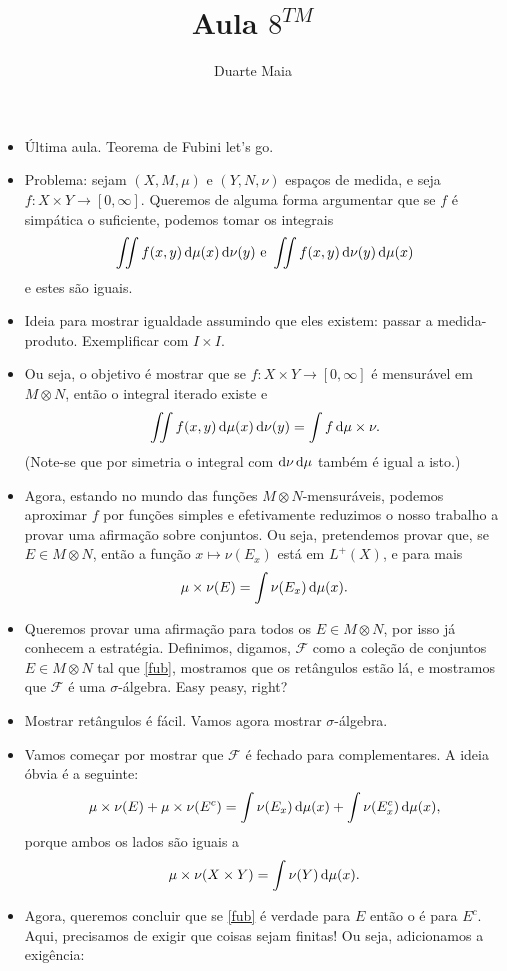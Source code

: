 \documentclass{article}
\title{Aula $8^{TM}$}
\author{Duarte Maia}
\date{}
\renewcommand{\cal}[1]{\mathcal{#1}}
\begin{document}
\maketitle

\begin{itemize}
\item Última aula. Teorema de Fubini let's go.
\item Problema: sejam $(X,M,\mu)$ e $(Y,N,\nu)$ espaços de medida, e seja $f : X \times Y \to [0,\infty]$. Queremos de alguma forma argumentar que se $f$ é simpática o suficiente, podemos tomar os integrais
\[\iint f(x,y) \dif \mu(x) \dif \nu(y) \text{ e } \iint f(x,y) \dif \nu(y) \dif \mu(x)\]
e estes são iguais.
\item Ideia para mostrar igualdade assumindo que eles existem: passar a medida-produto. Exemplificar com $I \times I$.
\item Ou seja, o objetivo é mostrar que se $f : X \times Y \to [0,\infty]$ é mensurável em $M \otimes N$, então o integral iterado existe e
\[\iint f(x,y) \dif \mu(x) \dif \nu(y) = \int f \dif \mu \times \nu.\]
(Note-se que por simetria o integral com $\dif \nu \dif \mu$ também é igual a isto.)
\item Agora, estando no mundo das funções $M \otimes N$-mensuráveis, podemos aproximar $f$ por funções simples e efetivamente reduzimos o nosso trabalho a provar uma afirmação sobre conjuntos. Ou seja, pretendemos provar que, se $E \in M \otimes N$, então a função $x \mapsto \nu(E_x)$ está em $L^+(X)$, e para mais
\begin{equation}\label{fub}
\mu \times \nu(E) = \int \nu(E_x) \dif \mu(x).
\end{equation}
\item Queremos provar uma afirmação para todos os $E \in M \otimes N$, por isso já conhecem a estratégia. Definimos, digamos, $\cal F$ como a coleção de conjuntos $E \in M \otimes N$ tal que \eqref{fub}, mostramos que os retângulos estão lá, e mostramos que $\cal F$ é uma $\sigma$-álgebra. Easy peasy, right?
\item Mostrar retângulos é fácil. Vamos agora mostrar $\sigma$-álgebra.
\item Vamos começar por mostrar que $\cal F$ é fechado para complementares. A ideia óbvia é a seguinte:
\[ \mu \times \nu(E) + \mu \times \nu(E^c) = \int \nu(E_x) \dif \mu(x) + \int \nu(E_x^c) \dif \mu(x),\]
porque ambos os lados são iguais a
\[\mu\times\nu(X\times Y) = \int \nu(Y) \dif \mu(x).\]
\item Agora, queremos concluir que se \eqref{fub} é verdade para $E$ então o é para $E^c$. Aqui, precisamos de exigir que coisas sejam finitas! Ou seja, adicionamos a exigência:

\end{itemize}
\end{document}
